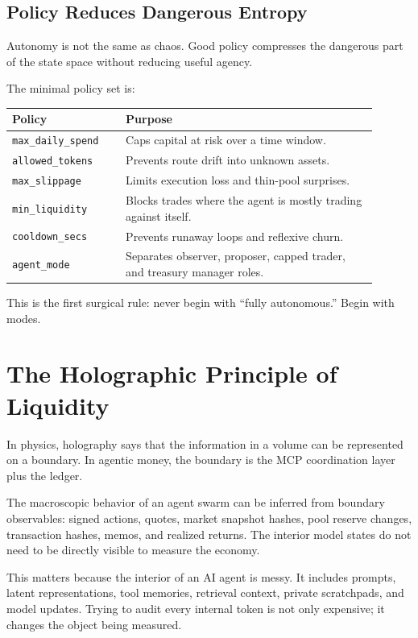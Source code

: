 \documentclass[11pt,a4paper]{article}
\begin{document}
\subsection{Policy Reduces Dangerous Entropy}

Autonomy is not the same as chaos. Good policy compresses the dangerous part of the state space without reducing useful agency.

The minimal policy set is:

\begin{longtable}{p{0.28\linewidth}p{0.62\linewidth}}
\toprule
\textbf{Policy} & \textbf{Purpose} \\
\midrule
\texttt{max\_daily\_spend} & Caps capital at risk over a time window. \\
\texttt{allowed\_tokens} & Prevents route drift into unknown assets. \\
\texttt{max\_slippage} & Limits execution loss and thin-pool surprises. \\
\texttt{min\_liquidity} & Blocks trades where the agent is mostly trading against itself. \\
\texttt{cooldown\_secs} & Prevents runaway loops and reflexive churn. \\
\texttt{agent\_mode} & Separates observer, proposer, capped trader, and treasury manager roles. \\
\bottomrule
\end{longtable}

This is the first surgical rule: never begin with ``fully autonomous.'' Begin with modes.

\section{The Holographic Principle of Liquidity}

In physics, holography says that the information in a volume can be represented on a boundary. In agentic money, the boundary is the MCP coordination layer plus the ledger.

\begin{principlebox}
The macroscopic behavior of an agent swarm can be inferred from boundary observables: signed actions, quotes, market snapshot hashes, pool reserve changes, transaction hashes, memos, and realized returns. The interior model states do not need to be directly visible to measure the economy.
\end{principlebox}

This matters because the interior of an AI agent is messy. It includes prompts, latent representations, tool memories, retrieval context, private scratchpads, and model updates. Trying to audit every internal token is not only expensive; it changes the object being measured.
\end{document}
